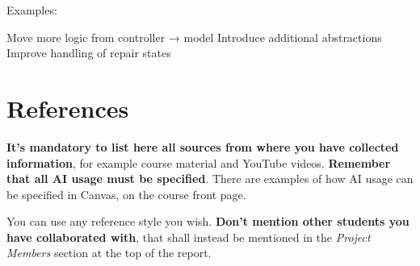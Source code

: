 \documentclass[a4paper]{scrartcl}
\begin{document}
Examples:

Move more logic from controller → model
Introduce additional abstractions
Improve handling of repair states

\section*{References}

\textbf{It's mandatory to list here all sources from where you have collected information}, for example course material and YouTube videos. \textbf{Remember that all AI usage must be specified}. There are examples of how AI usage can be specified in Canvas, on the course front page.

You can use any reference style you wish. \textbf{Don't mention other students you have collaborated with}, that shall instead be mentioned in the \textit{Project Members} section at the top of the report.
\end{document}
